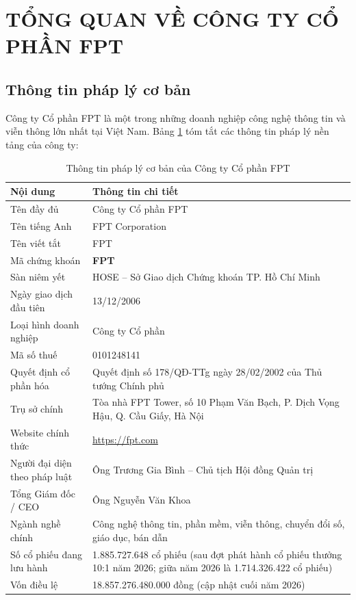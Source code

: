 \section{TỔNG QUAN VỀ CÔNG TY CỔ PHẦN FPT}

\subsection{Thông tin pháp lý cơ bản}
Công ty Cổ phần FPT là một trong những doanh nghiệp công nghệ thông tin và viễn thông lớn nhất tại Việt Nam. Bảng \ref{tab:thong_tin_phap_ly} tóm tắt các thông tin pháp lý nền tảng của công ty:

\begin{table}[htbp]
\centering
\caption{Thông tin pháp lý cơ bản của Công ty Cổ phần FPT}
\label{tab:thong_tin_phap_ly}
\begin{tabularx}{\textwidth}{p{4.2cm} X}
\toprule
\textbf{Nội dung} & \textbf{Thông tin chi tiết} \\
\midrule
Tên đầy đủ & Công ty Cổ phần FPT \\
Tên tiếng Anh & FPT Corporation \\
Tên viết tắt & FPT \\
Mã chứng khoán & \textbf{FPT} \\
Sàn niêm yết & HOSE -- Sở Giao dịch Chứng khoán TP. Hồ Chí Minh \\
Ngày giao dịch đầu tiên & 13/12/2006 \\
Loại hình doanh nghiệp & Công ty Cổ phần \\
Mã số thuế & 0101248141 \\
Quyết định cổ phần hóa & Quyết định số 178/QĐ-TTg ngày 28/02/2002 của Thủ tướng Chính phủ \\
Trụ sở chính & Tòa nhà FPT Tower, số 10 Phạm Văn Bạch, P. Dịch Vọng Hậu, Q. Cầu Giấy, Hà Nội \\
Website chính thức & \url{https://fpt.com} \\
Người đại diện theo pháp luật & Ông Trương Gia Bình -- Chủ tịch Hội đồng Quản trị \\
Tổng Giám đốc / CEO & Ông Nguyễn Văn Khoa \\
Ngành nghề chính & Công nghệ thông tin, phần mềm, viễn thông, chuyển đổi số, giáo dục, bán dẫn \\
Số cổ phiếu đang lưu hành & 1.885.727.648 cổ phiếu (sau đợt phát hành cổ phiếu thưởng 10:1 năm 2026; giữa năm 2026 là 1.714.326.422 cổ phiếu) \\
Vốn điều lệ & 18.857.276.480.000 đồng (cập nhật cuối năm 2026) \\
\bottomrule
\end{tabularx}
\end{table}

